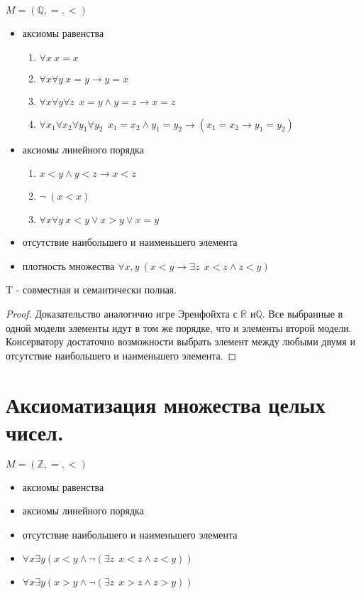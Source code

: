 \documentclass{article}
\begin{document}
\(M = ( \mathbb{Q}, =, <)\)
\begin{itemize}
    \item аксиомы равенства
    \begin{enumerate}
        \item \(\forall x \: x = x\)
        \item \(\forall x \forall y \: x = y \rightarrow y = x\)
        \item \(\forall x \forall y \forall z \: \: x = y \land y = z \rightarrow x = z\)
        \item \(\forall x_1 \forall x_2 \forall y_1 \forall y_2 \: \: x_1 = x_2 \land y_1 = y_2 \rightarrow (x_1 = x_2 \rightarrow y_1 = y_2)\)
    \end{enumerate}
    \item аксиомы линейного порядка
    \begin{enumerate}
        \item \(x < y \land y < z \rightarrow x < z\)
        \item \(\neg \: (x < x)\)
        \item \(\forall x \forall y \: x < y \lor x > y \lor x = y\)
    \end{enumerate}
    \item отсутствие наибольшего и наименьшего элемента
    \item плотность множества \(\forall x, y \: (x < y \rightarrow \exists z \: \:  x < z \land z < y)\)
\end{itemize}

\begin{theorem}{T - совместная и семантически полная.}
\begin{proof}
Доказательство аналогично игре Эренфойхта с \(\mathbb{R}\) и\(\mathbb{Q}\). Все выбранные в одной модели элементы идут в том же порядке, что и элементы второй модели. Консерватору достаточно возможности выбрать элемент между любыми двумя и отсутствие наибольшего и наименьшего элемента.
\end{proof}
\end{theorem}

\setcounter{section}{27}
\section{Аксиоматизация множества целых чисел.}

\(M = (\mathbb{Z}, =, <)\)
\begin{itemize}
    \item аксиомы равенства
    \item аксиомы линейного порядка
    \item отсутствие наибольшего и наименьшего элемента
    \item \(\forall x \exists y (x < y \land \neg (\exists z \: \: x < z \land z < y))\)
    \item \(\forall x \exists y (x > y \land \neg (\exists z \: \: x > z \land z > y))\)
\end{itemize}
\end{document}
